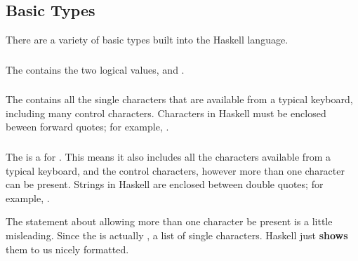 \subsection{Basic Types}\label{subsec:Basic_Types}
There are a variety of basic types built into the Haskell language.

\subsubsection{\texorpdfstring{}{\texttt{Bool}}}\label{subsubsec:Bool_Type}
The   contains the two logical values,  and .

\subsubsection{\texorpdfstring{}{\texttt{Char}}}\label{subsubsec:Char_Type}
The   contains all the single characters that are available from a typical keyboard, including many control characters.
Characters in Haskell must be enclosed beween forward quotes; for example, .

\subsubsection{\texorpdfstring{}{\texttt{String}}}\label{subsubsec:String_Type}
The   is a  for \haskellinline{[Char]}.
This means it also includes all the characters available from a typical keyboard, and the control characters, however more than one character can be present.
Strings in Haskell are enclosed between double quotes; for example, .

\begin{remark*}
  The statement about allowing more than one character be present is a little misleading.
  Since the   is actually \haskellinline{[Char]}, a list of single characters.
  Haskell just \textbf{shows} them to us nicely formatted.
\end{remark*}

\subsubsection{\texorpdfstring{}{\texttt{Int}}}\label{subsubsec:Int_Type}

\subsubsection{\texorpdfstring{}{\texttt{Integer}}}\label{subsubsec:Integer_Type}

\subsubsection{\texorpdfstring{}{\texttt{Float}}}\label{subsubsec:Float_Type}

